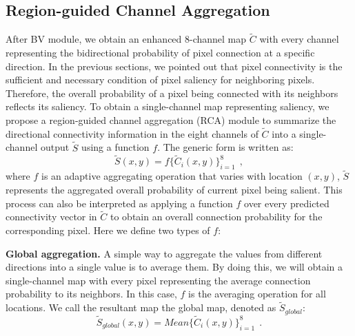 \documentclass[final]{cvpr}
\begin{document}
\subsection{Region-guided Channel Aggregation}
\label{section3.4}
After BV module, we obtain an enhanced 8-channel map $\widetilde {C}$ with every channel representing the bidirectional probability of pixel connection at a specific direction. In the previous sections, we pointed out that pixel connectivity is the sufficient and necessary condition of pixel saliency for neighboring pixels. Therefore, the overall probability of a pixel being connected with its neighbors reflects its saliency. To obtain a single-channel map representing saliency, we propose a region-guided channel aggregation (RCA) module to summarize the directional connectivity information in the eight channels of $\widetilde {C}$ into a single-channel output $\widetilde {S}$ using a function $f$. The generic form is written as:
\begin{equation}
\widetilde S(x,y) = f\{ {\widetilde C_i}(x,y)\} _{i = 1}^8\ \ ,
\end{equation}
where $f$ is an adaptive aggregating operation that varies with location $(x,y)$, $\widetilde {S}$ represents the aggregated overall probability of current pixel being salient. This process can also be interpreted as applying a function $f$ over every predicted connectivity vector in $\widetilde {C}$ to obtain an overall connection probability for the corresponding pixel. Here we define two types of $f$:

\textbf{Global aggregation.} A simple way to aggregate the values from different directions into a single value is to average them. By doing this, we will obtain a single-channel map with every pixel representing the average connection probability to its neighbors. In this case, $f$ is the averaging operation for all locations. We call the resultant map the global map, denoted as $\widetilde S_{global}$:
\begin{equation}
{\widetilde S_{global}}(x,y) = Mean\{ {\widetilde C_i}(x,y)\} _{i = 1}^8\ \ .
\end{equation}
\end{document}
